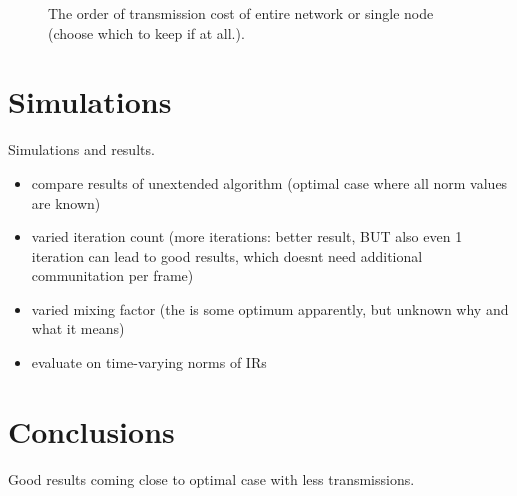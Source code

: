 \documentclass{article}
\begin{document}
\begin{figure}
  \centering
  
  
  \vspace*{-0.8cm}
  \caption[]{The order of transmission cost of entire network or single node (choose which to keep if at all.).}
  \label{fig:transcost:bigo}
\end{figure}

\section{Simulations}
\label{sec:simulations}
Simulations and results.
\begin{itemize}
  \item compare results of unextended algorithm (optimal case where all norm values are known)
  \item varied iteration count (more iterations: better result, BUT also even 1 iteration can lead to good results, which doesnt need additional communitation per frame)
  \item varied mixing factor (the is some optimum apparently, but unknown why and what it means)
  \item evaluate on time-varying norms of IRs
\end{itemize}

\section[]{Conclusions}
\label{sec:conclusions}
Good results coming close to optimal case with less transmissions.


\end{document}
